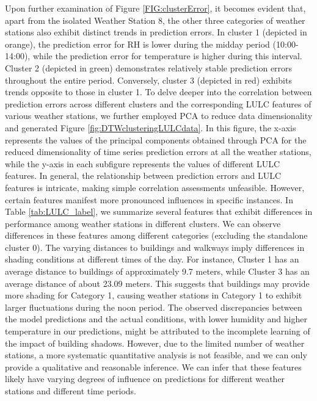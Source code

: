 \documentclass[a4paper,fleqn]{cas-sc}
\begin{document}
Upon further examination of Figure \ref{FIG:clusterError}, it becomes evident that, apart from the isolated Weather Station 8, the other three categories of weather stations also exhibit distinct trends in prediction errors. In cluster 1 (depicted in orange), the prediction error for RH is lower during the midday period (10:00-14:00), while the prediction error for temperature is higher during this interval. Cluster 2 (depicted in green) demonstrates relatively stable prediction errors throughout the entire period. Conversely, cluster 3 (depicted in red) exhibits trends opposite to those in cluster 1. To delve deeper into the correlation between prediction errors across different clusters and the corresponding LULC features of various weather stations, we further employed PCA to reduce data dimensionality and generated Figure \ref{fig:DTWclusteringLULCdata}. In this figure, the x-axis represents the values of the principal components obtained through PCA for the reduced dimensionality of time series prediction errors at all the weather stations, while the y-axis in each subfigure represents the values of different LULC features. In general, the relationship between prediction errors and LULC features is intricate, making simple correlation assessments unfeasible. However, certain features manifest more pronounced influences in specific instances. In Table \ref{tab:LULC_label}, we summarize several features that exhibit differences in performance among weather stations in different clusters. We can observe differences in these features among different categories (excluding the standalone cluster 0). The varying distances to buildings and walkways imply differences in shading conditions at different times of the day. For instance, Cluster 1 has an average distance to buildings of approximately 9.7 meters, while Cluster 3 has an average distance of about 23.09 meters. This suggests that buildings may provide more shading for Category 1, causing weather stations in Category 1 to exhibit larger fluctuations during the noon period. The observed discrepancies between the model predictions and the actual conditions, with lower humidity and higher temperature in our predictions, might be attributed to the incomplete learning of the impact of building shadows. However, due to the limited number of weather stations, a more systematic quantitative analysis is not feasible, and we can only provide a qualitative and reasonable inference. We can infer that these features likely have varying degrees of influence on predictions for different weather stations and different time periods.
\end{document}

